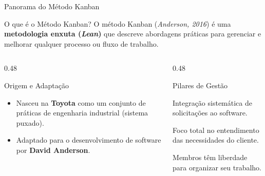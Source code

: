 \documentclass[aspectratio=169, 9pt]{beamer}
\begin{document}
\begin{frame}{Panorama do Método Kanban}
  \begin{block}{O que é o Método Kanban?}
    O método Kanban (\textit{Anderson, 2016}) é uma \textbf{metodologia enxuta (\textit{Lean})} que descreve abordagens práticas para gerenciar e melhorar qualquer processo ou fluxo de trabalho.
  \end{block}

  \vspace{0.2cm}

  \begin{columns}[T]
    \begin{column}{0.48\textwidth}
      \begin{exampleblock}{Origem e Adaptação}
        \begin{itemize}
          \item Nasceu na \textbf{Toyota} como um conjunto de práticas de engenharia industrial (sistema puxado).
          \item Adaptado para o desenvolvimento de software por \textbf{David Anderson}.
        \end{itemize}
      \end{exampleblock}
    \end{column}

    \begin{column}{0.48\textwidth}
      \begin{alertblock}{Pilares de Gestão}
        \begin{description}[Serviços]
          \item[\textbf{Gestão de Alterações:}] Integração sistemática de solicitações ao software.
          \item[\textbf{Entrega de Serviços:}] Foco total no entendimento das necessidades do cliente.
          \item[\textbf{Auto-organização:}] Membros têm liberdade para organizar seu trabalho.
        \end{description}
      \end{alertblock}
    \end{column}
  \end{columns}
\end{frame}
\end{document}
